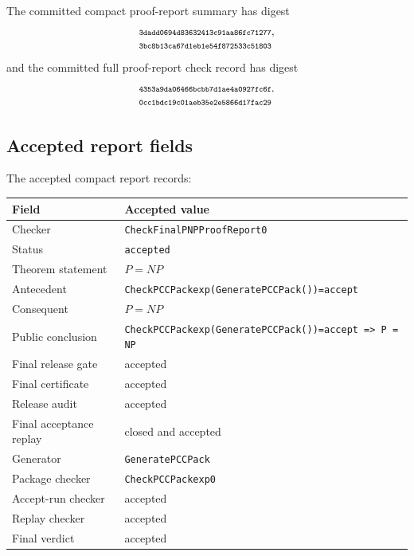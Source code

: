 \documentclass[10.5pt,a4paper]{article}
\makeatletter
\newcommand{\hashpair}[2]{\begin{tabular}[t]{@{}l@{}}\texttt{\scriptsize #1}\\\texttt{\scriptsize #2}\end{tabular}}
\makeatother
\begin{document}
The committed compact proof-report summary has digest
\[
\hashpair{3dadd0694d83632413c91aa86fc71277}{3bc8b13ca67d1eb1e54f872533c51803},
\]
and the committed full proof-report check record has digest
\[
\hashpair{4353a9da06466bcbb7d1ae4a0927fc6f}{0cc1bdc19c01aeb35e2e5866d17fac29}.
\]

\subsection{Accepted report fields}
The accepted compact report records:
\begin{longtable}{>{\raggedright\arraybackslash}p{}p{}}
\toprule
Field & Accepted value\\
\midrule
Checker & \texttt{CheckFinalPNPProofReport0}\\
Status & \texttt{accepted}\\
Theorem statement & \(P=NP\)\\
Antecedent & \texttt{CheckPCCPackexp(GeneratePCCPack())=accept}\\
Consequent & \(P=NP\)\\
Public conclusion & \texttt{CheckPCCPackexp(GeneratePCCPack())=accept => P = NP}\\
Final release gate & accepted\\
Final certificate & accepted\\
Release audit & accepted\\
Final acceptance replay & closed and accepted\\
Generator & \texttt{GeneratePCCPack}\\
Package checker & \texttt{CheckPCCPackexp0}\\
Accept-run checker & accepted\\
Replay checker & accepted\\
Final verdict & accepted\\
\bottomrule
\end{longtable}
\end{document}
